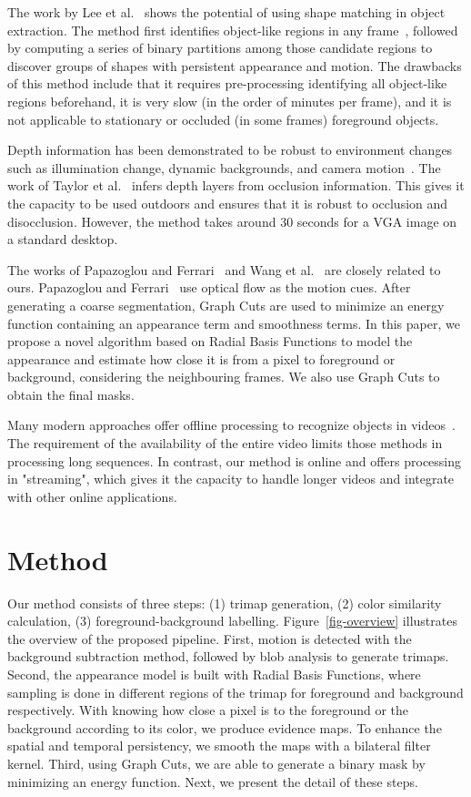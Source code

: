 The work by Lee et al.~\cite{lee2011} shows the potential of using shape matching in object extraction.
The method first identifies object-like regions in any frame~\cite{endres2010}, followed by computing a series of binary partitions among those candidate regions to discover groups of shapes with persistent appearance and motion.
The drawbacks of this method include that it requires pre-processing identifying all object-like regions beforehand, it is very slow (in the order of minutes per frame), and it is not applicable to stationary or occluded (in some frames) foreground objects.

Depth information has been demonstrated to be robust to environment changes such as illumination change, dynamic backgrounds, and camera motion~\cite{dahan2011,taylor2015}.
The work of Taylor et al.~\cite{taylor2015} infers depth layers from occlusion information. This gives it the capacity to be used outdoors and ensures that it is robust to occlusion and disocclusion. However, the method takes around 30 seconds for a VGA image on a standard desktop.

The works of Papazoglou and Ferrari~\cite{papazoglou2013} and Wang et al.~\cite{wang2015} are closely related to ours. Papazoglou and Ferrari~\cite{papazoglou2013} use optical flow as the motion cues. After generating a coarse segmentation, Graph Cuts are used to minimize an energy function containing an appearance term and smoothness terms. In this paper, we propose a novel algorithm based on Radial Basis Functions to model the appearance and estimate how close it is from a pixel to foreground or background, considering the neighbouring frames. We also use Graph Cuts to obtain the final masks.

Many modern approaches offer offline processing to recognize objects in videos~\cite{papazoglou2013,ma2012,wang2015,brox2010}. The requirement of the availability of the entire video limits those methods in processing long sequences.
In contrast, our method is online and offers processing in "streaming", which gives it the capacity to handle longer videos and integrate with other online applications.

\section{Method}
\label{sec:vos:m}

Our method consists of three steps: (1) trimap generation, (2) color similarity calculation, (3) foreground-background labelling. Figure~\ref{fig-overview} illustrates the overview of the proposed pipeline. First, motion is detected with the background subtraction method, followed by blob analysis to generate trimaps. Second, the appearance model is built with Radial Basis Functions, where sampling is done in different regions of the trimap for foreground and background respectively. With knowing how close a pixel is to the foreground or the background according to its color, we produce evidence maps. To enhance the spatial and temporal persistency, we smooth the maps with a bilateral filter kernel. Third, using Graph Cuts, we are able to generate a binary mask by minimizing an energy function. Next, we present the detail of these steps.


